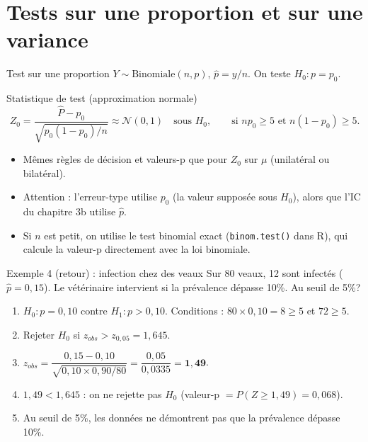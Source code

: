 \documentclass{BeamerTemplate}
\begin{document}
\section{Tests sur une proportion et sur une variance}

\begin{frame}[t]{Test sur une proportion}
  $Y \sim \text{Binomiale}(n, p)$, $\hat{p} = y/n$. On teste $H_0 : p = p_0$.

  \begin{Boite}{Statistique de test (approximation normale)}
    $$Z_0 = \frac{\widehat{P} - p_0}{\sqrt{p_0(1-p_0)/n}} \approx \mathcal{N}(0,1) \quad \text{sous } H_0,
    \qquad \text{si } np_0 \ge 5 \text{ et } n(1-p_0) \ge 5.$$
  \end{Boite}

  \vspace{-3mm}
  \begin{itemize}\itemsep 1mm
    \item<2-> Mêmes règles de décision et valeurs-p que pour $Z_0$ sur $\mu$ (unilatéral ou bilatéral).
    \item<3-> \alert{Attention :} l'erreur-type utilise $p_0$ (la valeur supposée sous $H_0$), alors que l'IC du chapitre 3b utilise $\hat{p}$.
    \item<4-> Si $n$ est petit, on utilise le \alert{test binomial exact} (\texttt{binom.test()} dans R), qui calcule la valeur-p directement avec la loi binomiale.
  \end{itemize}
\end{frame}

\begin{frame}[t]{Exemple 4 (retour) : infection chez des veaux}
  Sur 80 veaux, 12 sont infectés ($\hat{p} = 0{,}15$). Le vétérinaire intervient si la prévalence \alert{dépasse 10\%}. Au seuil de 5\%?

  \medskip
  \begin{enumerate}\itemsep 1.5mm
    \item<2-> $H_0 : p = 0{,}10$ contre $H_1 : p > 0{,}10$. Conditions : $80 \times 0{,}10 = 8 \ge 5$ et $72 \ge 5$.
    \item<3-> Rejeter $H_0$ si $z_{obs} > z_{0{,}05} = 1{,}645$.
    \item<4-> $z_{obs} = \dfrac{0{,}15 - 0{,}10}{\sqrt{0{,}10 \times 0{,}90 / 80}} = \dfrac{0{,}05}{0{,}0335} = \mathbf{1{,}49}$.
    \item<5-> $1{,}49 < 1{,}645$ : on \alert{ne rejette pas $H_0$} (valeur-p $= P(Z \ge 1{,}49) = 0{,}068$).
    \item<6-> Au seuil de 5\%, les données ne démontrent pas que la prévalence dépasse 10\%.
  \end{enumerate}

  \medskip
\end{frame}
\end{document}
